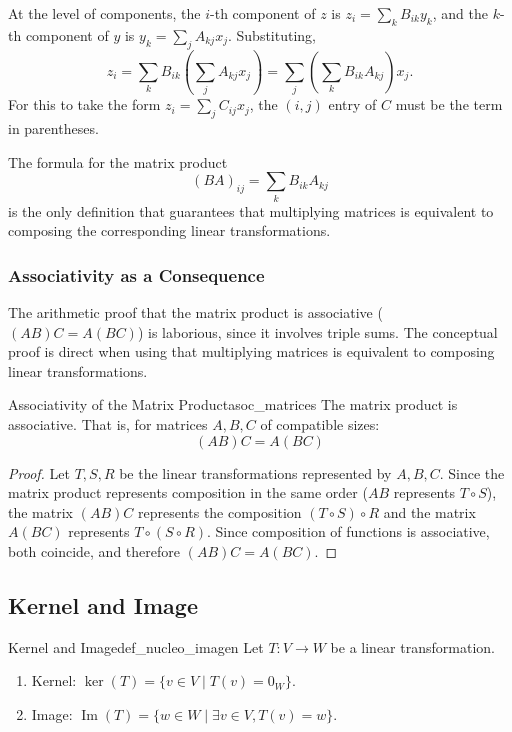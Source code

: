 \documentclass[11pt, a4paper]{article}
\begin{document}
At the level of components, the $i$-th component of $z$ is $z_i = \sum_{k} B_{ik} y_k$, and the $k$-th component of $y$ is $y_k = \sum_{j} A_{kj} x_j$. Substituting,
\[ z_i = \sum_{k} B_{ik} \left( \sum_{j} A_{kj} x_j \right) = \sum_{j} \left( \sum_{k} B_{ik} A_{kj} \right) x_j. \]
For this to take the form $z_i = \sum_{j} C_{ij} x_j$, the $(i, j)$ entry of $C$ must be the term in parentheses.

\obs
The formula for the matrix product
\[ (BA)_{ij} = \sum_{k} B_{ik} A_{kj} \]
is the only definition that guarantees that multiplying matrices is equivalent to composing the corresponding linear transformations.

\subsubsection{Associativity as a Consequence}

The arithmetic proof that the matrix product is associative ($(AB)C = A(BC)$) is laborious, since it involves triple sums. The conceptual proof is direct when using that multiplying matrices is equivalent to composing linear transformations.

\begin{proposicion}{Associativity of the Matrix Product}{asoc_matrices}
The matrix product is associative. That is, for matrices $A, B, C$ of compatible sizes:
\[ (AB)C = A(BC) \]
\end{proposicion}

\begin{proof}
Let $T, S, R$ be the linear transformations represented by $A, B, C$. Since the matrix product represents composition in the same order ($AB$ represents $T \circ S$), the matrix $(AB)C$ represents the composition $(T \circ S) \circ R$ and the matrix $A(BC)$ represents $T \circ (S \circ R)$. Since composition of functions is associative, both coincide, and therefore $(AB)C = A(BC)$.
\end{proof}

\subsection{Kernel and Image}

\begin{definicion}{Kernel and Image}{def_nucleo_imagen}
Let $T: V \to W$ be a linear transformation.
\begin{enumerate}
    \item Kernel: $\ker(T) = \{v \in V \mid T(v) = 0_W\}$.
    \item Image: $\operatorname{Im}(T) = \{w \in W \mid \exists v \in V, T(v) = w\}$.
\end{enumerate}
\end{definicion}
\end{document}
